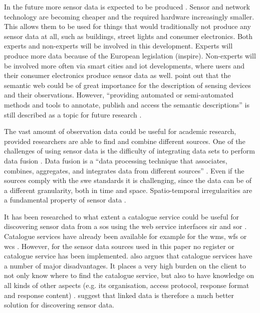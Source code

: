 In the future more sensor data is expected to be produced \citep{IoT:PWC}. Sensor and network technology are becoming cheaper and the required hardware increasingly smaller. This allows them to be used for things that would traditionally not produce any sensor data at all, such as buildings, street lights and consumer electronics. Both experts and non-experts will be involved in this development. Experts will produce more data because of the European legislation (\ac{inspire}). Non-experts will be involved more often via smart cities and \ac{iot} developments, where users and their consumer electronics produce sensor data as well. \cite{IOT:Barnaghi} point out that the semantic web could be of great importance for the description of sensing devices and their observations. However, \enquote{providing automated or semi-automated methods and tools to annotate, publish and access the semantic descriptions} is still described as a topic for future research \cite[p. 19]{IOT:Barnaghi}. 

The vast amount of observation data could be useful for academic research, provided researchers are able to find and combine different sources. One of the challenges of using sensor data is the difficulty of integrating data sets to perform data fusion \citep{SSW:Corcho, SSW:Ji, SSW:Wang}. Data fusion is a \enquote{data processing technique that associates, combines, aggregates, and integrates data from different sources} \cite[p. 2]{SSW:Wang2}. Even if the sources comply with the \ac{swe} standards it is challenging, since the data can be of a different granularity, both in time and space. Spatio-temporal irregularities are a fundamental property of sensor data \citep{SW:Ganesan}. 

It has been researched to what extent a catalogue service could be useful for discovering sensor data from a \ac{sos} using the web service interfaces \ac{sir} \citep{SW:OGC3} and \ac{sor} \citep{SW:OGC4}. Catalogue services have already been available for example for the \ac{wms}, \ac{wfs} or \ac{wcs} \citep{SDI:OGC2}. However, for the sensor data sources used in this paper no register or catalogue service has been implemented. \cite{SSW:Atkinson} also argues that catalogue services have a number of major disadvantages. It places a very high burden on the client to not only know where to find the catalogue service, but also to have knowledge on all kinds of other aspects (e.g. its organisation, access protocol, response format and response content) \cite[p. 128]{SSW:Atkinson}. \citeauthor{SSW:Atkinson} suggest that linked data is therefore a much better solution for discovering sensor data. 

